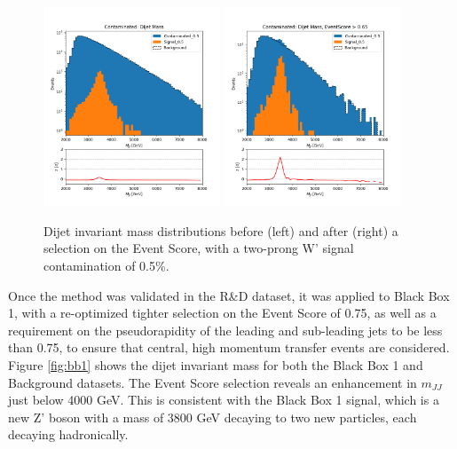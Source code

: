 \documentclass[letterpaper,11pt]{article}
\begin{document}
\begin{figure}[h!]
	\begin{center}
		\includegraphics[width=0.47\textwidth]{imgs/2Prong_Contaminated_0p5_JJ_Mass_Multi.png}
		\includegraphics[width=0.47\textwidth]{imgs/2Prong_Contaminated_0p5_JJ_Mass_EventScore0p65_Multi.png}
	\end{center}
	\caption{Dijet invariant mass distributions before (left) and after (right) a selection on the Event Score, with a two-prong W' signal contamination of 0.5\%.}
	\label{fig:m_JJ}
\end{figure}

Once the method was validated in the R\&D dataset, it was applied to Black Box 1, with a re-optimized tighter selection on the Event Score of 0.75, as well as a requirement on the pseudorapidity of the leading and sub-leading jets to be less than 0.75, to ensure that central, high momentum transfer events are considered. Figure {\ref{fig:bb1}} shows the dijet invariant mass for both the Black Box 1 and Background datasets. The Event Score selection reveals an enhancement in $m_{JJ}$ just below 4000 GeV. This is consistent with the Black Box 1 signal, which is a new Z' boson with a mass of 3800 GeV decaying to two new particles, each decaying hadronically.
\end{document}
